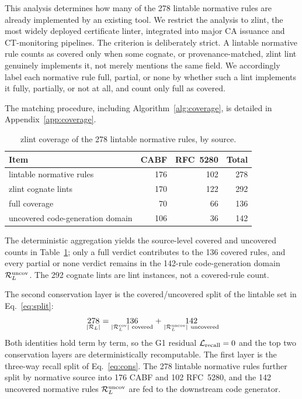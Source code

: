 This analysis determines how many of the 278 lintable normative rules are
already implemented by an existing tool. We restrict the analysis to zlint,
the most widely deployed certificate linter, integrated into major CA issuance
and CT-monitoring pipelines. The criterion is deliberately strict. A lintable
normative rule counts as covered only when some cognate, or provenance-matched,
zlint lint genuinely implements it, not merely mentions the same field. We
accordingly label each normative rule full, partial, or none by whether such a
lint implements it fully, partially, or not at all, and count only full as
covered.

The matching procedure, including Algorithm~\ref{alg:coverage}, is
detailed in Appendix~\ref{app:coverage}.

\begin{table}[!htbp]
\centering
\small
\setlength{\tabcolsep}{3pt}
\caption{zlint coverage of the 278 lintable normative rules, by source.}
\label{tab:coverage}
\begin{tabularx}{\columnwidth}{@{}X r r r@{}}
\toprule
Item & CABF & RFC~5280 & Total \\
\midrule
lintable normative rules & 176 & 102 & 278 \\
zlint cognate lints & 170 & 122 & 292 \\
full coverage & 70 & 66 & 136 \\
uncovered code-generation domain & 106 & 36 & 142 \\
\bottomrule
\end{tabularx}
\end{table}

The deterministic aggregation yields the source-level covered and uncovered
counts in Table~\ref{tab:coverage}; only a full verdict contributes to the 136
covered rules, and every partial or none verdict remains in the 142-rule
code-generation domain $\mathcal{R}_L^{\mathrm{uncov}}$. The 292 cognate lints are lint instances, not
a covered-rule count.

The second conservation layer is the covered/uncovered split of the lintable
set in Eq.~\eqref{eq:split}:
\[
\begin{array}{c @{\;} c @{\;} c @{\;} c @{\;} c @{\;} c @{\;} c}
  \underset{|\RL|}{278} & = & \underset{|\RLcov|\ \text{covered}}{136} & + & \underset{|\RLunc|\ \text{uncovered}}{142}
\end{array}
\]
Both identities hold term by term, so the G1 residual $\mathcal{L}_{\mathrm{recall}} = 0$ and the top
two conservation layers are deterministically recomputable. The
first layer is the three-way recall split of Eq.~\eqref{eq:cons}.
The 278 lintable normative rules further split by normative source into 176 CABF
and 102 RFC~5280, and the 142 uncovered normative rules $\mathcal{R}_L^{\mathrm{uncov}}$ are fed to the
downstream code generator.

